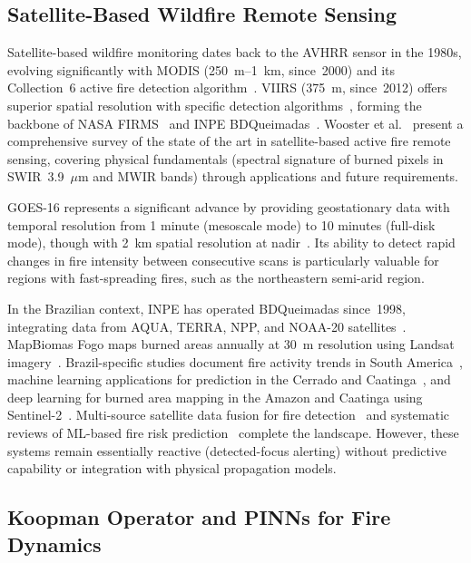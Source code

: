 \documentclass[preprint,12pt,times,numbers]{elsarticle}
\begin{document}
\subsection{Satellite-Based Wildfire Remote Sensing}

Satellite-based wildfire monitoring dates back to the AVHRR sensor in the 1980s, evolving significantly with MODIS (250~m--1~km, since~2000) and its Collection~6 active fire detection algorithm~\cite{article:giglio2016}. VIIRS (375~m, since~2012) offers superior spatial resolution with specific detection algorithms~\cite{article:schroeder2014}, forming the backbone of NASA FIRMS~\cite{manual:firms2024} and INPE BDQueimadas~\cite{article:inpe2023}. Wooster et al.~\cite{article:wooster2021} present a comprehensive survey of the state of the art in satellite-based active fire remote sensing, covering physical fundamentals (spectral signature of burned pixels in SWIR~3.9~$\mu$m and MWIR bands) through applications and future requirements.

GOES-16 represents a significant advance by providing geostationary data with temporal resolution from 1 minute (mesoscale mode) to 10 minutes (full-disk mode), though with 2~km spatial resolution at nadir~\cite{techreport:goes2022}. Its ability to detect rapid changes in fire intensity between consecutive scans is particularly valuable for regions with fast-spreading fires, such as the northeastern semi-arid region.

In the Brazilian context, INPE has operated BDQueimadas since~1998, integrating data from AQUA, TERRA, NPP, and NOAA-20 satellites~\cite{article:inpe2023}. MapBiomas Fogo maps burned areas annually at 30~m resolution using Landsat imagery~\cite{website:mapbiomas}. Brazil-specific studies document fire activity trends in South America~\cite{article:mccarty2024}, machine learning applications for prediction in the Cerrado and Caatinga~\cite{article:alves2023}, and deep learning for burned area mapping in the Amazon and Caatinga using Sentinel-2~\cite{article:arruda2025}. Multi-source satellite data fusion for fire detection~\cite{article:gargiulo2023} and systematic reviews of ML-based fire risk prediction~\cite{article:hodzic2024} complete the landscape. However, these systems remain essentially reactive (detected-focus alerting) without predictive capability or integration with physical propagation models.

\subsection{Koopman Operator and PINNs for Fire Dynamics}
\end{document}

